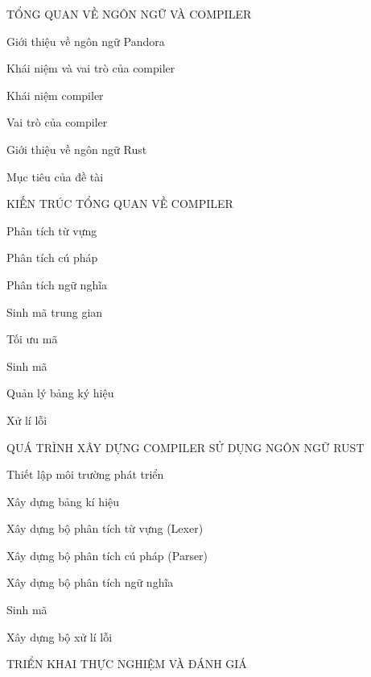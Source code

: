 \documentclass[11pt,a4paper]{article}
\begin{document}
    \begin{mucluc}
        \item TỔNG QUAN VỀ NGÔN NGỮ VÀ COMPILER
        \begin{mucluc}
            \item Giới thiệu về ngôn ngữ Pandora
            \item Khái niệm và vai trò của compiler
            \begin{mucluc}
                \item Khái niệm compiler
                \item Vai trò của compiler
            \end{mucluc}
            \item Giới thiệu về ngôn ngữ Rust
            \item Mục tiêu của đề tài
        \end{mucluc}
        \item KIẾN TRÚC TỔNG QUAN VỀ COMPILER
        \begin{mucluc}
            \item Phân tích từ vựng
            \item Phân tích cú pháp
            \item Phân tích ngữ nghĩa
            \item Sinh mã trung gian
            \item Tối ưu mã
            \item Sinh mã
            \item Quản lý bảng ký hiệu
            \item Xử lí lỗi
        \end{mucluc}
        \item QUÁ TRÌNH XÂY DỰNG COMPILER SỬ DỤNG NGÔN NGỮ RUST
        \begin{mucluc}
            \item Thiết lập môi trường phát triển
            \item Xây dựng bảng kí hiệu
            \item Xây dựng bộ phân tích từ vựng (Lexer)
            \item Xây dựng bộ phân tích cú pháp (Parser)
            \item Xây dựng bộ phân tích ngữ nghĩa
            \item Sinh mã
            \item Xây dựng bộ xử lí lỗi
        \end{mucluc}
        \item TRIỂN KHAI THỰC NGHIỆM VÀ ĐÁNH GIÁ

\end{mucluc}
\end{document}

